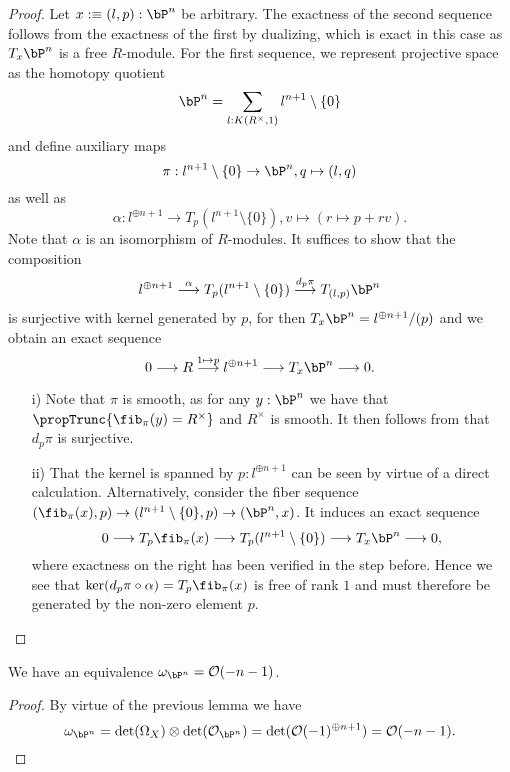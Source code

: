 \begin{proof}
  Let $x :\equiv (l,p) : \bP^n$ be arbitrary.
  The exactness of the second sequence follows from the exactness of the first by dualizing,
  which is exact in this case as $T_x\bP^n$ is a free $R$-module.
  For the first sequence, we represent projective space as the homotopy quotient
  \[
    \bP^n = \sum_{l : K(R^\times,1)} l^{n+1}\setminus\{0\}
  \]
  and define auxiliary maps
  \[
    \pi : l^{n+1}\setminus\{0\} \to \bP^n, q \mapsto (l,q)
  \]
  as well as
  \[
    \alpha : l^{\oplus n+1} \to T_p(l^{n+1}\setminus\{0\}), v \mapsto (r \mapsto p + rv).
  \]
  Note that $\alpha$ is an isomorphism of $R$-modules.
  It suffices to show that the composition
  \[
    l^{\oplus n+1} \overset{\alpha}{\longrightarrow}
    T_p(l^{n+1}\setminus\{0\}) \overset{d_p\pi}{\longrightarrow}
  T_{(l,p)}\bP^n
  \]
  is surjective with kernel generated by $p$, for then $T_x\bP^n = l^{\oplus n+1}/(p)$ and we obtain an exact sequence
  \[
    0 \longrightarrow
    R \overset{1 \mapsto p}{\longrightarrow}
    l^{\oplus n+1} \longrightarrow
    T_x\bP^n \longrightarrow 0.
  \]
  \begin{enumerate}
    \item[i)]
    Note that $\pi$ is smooth, as for any $y : \bP^n$ we have that $\propTrunc{\fib_\pi(y) = R^\times}$ and $R^\times$ is smooth.
    It then follows from \cite[Corollary 8.4.2]{etale-draft} that $d_p\pi$ is surjective.


    \item[ii)]
    That the kernel is spanned by $p : l^{\oplus n+1}$ can be seen by virtue of a direct calculation.
    Alternatively, consider the fiber sequence $(\fib_\pi(x),p) \to (l^{n+1}\setminus\{0\},p) \to (\bP^n,x)$.
    It induces an exact sequence
    \[
      0 \longrightarrow
      T_p\fib_\pi(x) \longrightarrow
      T_p(l^{n+1}\setminus\{0\}) \longrightarrow
      T_x\bP^n \longrightarrow
      0,
    \]
    where exactness on the right has been verified in the step before.
    Hence we see that $\ker(d_p\pi \circ \alpha) = T_p\fib_\pi(x)$ is free of rank $1$ and must therefore be generated by the non-zero element $p$.
\end{enumerate}
\end{proof}

\begin{corollary}\label{canonical-bundle-as-twist}
  We have an equivalence $\omega_{\bP^n} = \mathcal O(-n-1)$.
\end{corollary}

\begin{proof}
  By virtue of the previous lemma we have
  \[
    \omega_{\bP^n} = \det(\Omega_X) \otimes \det(\mathcal O_{\bP^n}) = \det(\mathcal O(-1)^{\oplus n+1}) = \mathcal O (-n-1).
  \]
\end{proof}
